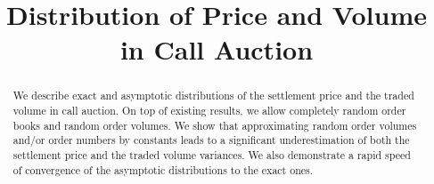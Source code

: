 \documentclass{aptpub}
\begin{document}

\title{Distribution of Price and Volume in Call Auction} %



\begin{abstract}

We describe exact and asymptotic distributions of the settlement price and the traded volume in call auction. On top of existing results, we allow completely random order books and random order volumes. We show that approximating random order volumes and/or order numbers by constants leads to a significant underestimation of both the settlement price and the traded volume variances. We also demonstrate a rapid speed of convergence of the asymptotic distributions to the exact ones. 

\end{abstract}


\end{document}
